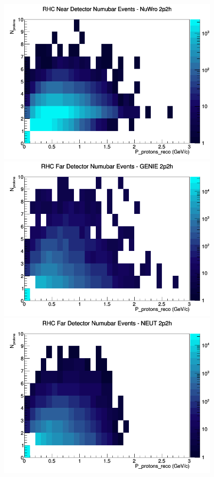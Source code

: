 \documentclass[12pt]{article}
\begin{document}
\begin{figure}[h]
\includegraphics[width=\linewidth]{eff_N_P/GAr/protons/2p2h_RHC_ND_numubar_N_P_NuWro.png}
\endminipage
\newline
{}
\includegraphics[width=\linewidth]{eff_N_P/GAr/protons/2p2h_RHC_FD_numubar_N_P_GENIE.png}
\endminipage
{}
\includegraphics[width=\linewidth]{eff_N_P/GAr/protons/2p2h_RHC_FD_numubar_N_P_NEUT.png}

\end{figure}
\end{document}
